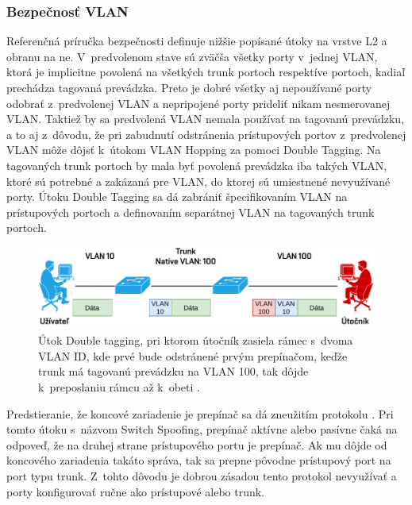 \subsubsection{Bezpečnosť VLAN}
Referenčná príručka bezpečnosti \cite{uYLsMtQInofenpV3} definuje nižšie popísané útoky na vrstve L2 a obranu na ne. V~predvolenom stave sú zväčša všetky porty v~jednej VLAN, ktorá je implicitne povolená na všetkých trunk portoch respektíve portoch, kadiaľ prechádza tagovaná prevádzka. Preto je dobré všetky aj nepoužívané porty odobrať z~predvolenej VLAN a nepripojené porty prideliť nikam nesmerovanej VLAN. Taktiež by sa predvolená VLAN nemala používať na tagovanú prevádzku, a to aj z~dôvodu, že pri zabudnutí odstránenia prístupových portov z~predvolenej VLAN môže dôjsť k~útokom VLAN Hopping za pomoci Double Tagging. Na tagovaných trunk portoch by mala byť povolená prevádzka iba takých VLAN, ktoré sú potrebné a zakázaná pre VLAN, do ktorej sú umiestnené nevyužívané porty. Útoku Double Tagging sa dá zabrániť špecifikovaním VLAN na prístupových portoch a definovaním separátnej VLAN na tagovaných trunk portoch.

\begin{figure}[H]
	\begin{center}
		\includegraphics[scale=0.75]{obrazky/double-tagging.pdf}
	\end{center}
	\caption[VLAN Hopping s~Double Tagging]{Útok Double tagging, pri ktorom útočník zasiela rámec s~dvoma VLAN ID, kde prvé bude odstránené prvým prepínačom, keďže trunk má tagovanú prevádzku na VLAN 100, tak dôjde k~preposlaniu rámcu až k~obeti \cite{srOo9OPXJxHjPBgo}.}
	\label{fig:double-tagging}
\end{figure} 

Predstieranie, že koncové zariadenie je prepínač sa dá zneužitím protokolu  \cite{uYLsMtQInofenpV3}. Pri tomto útoku s~názvom Switch Spoofing, prepínač aktívne alebo pasívne čaká na odpoveď, že na druhej strane prístupového portu je prepínač. Ak mu dôjde od koncového zariadenia takáto správa, tak sa prepne pôvodne prístupový port na port typu trunk. Z~tohto dôvodu je dobrou zásadou tento protokol nevyužívať a porty konfigurovať ručne ako prístupové alebo trunk.

